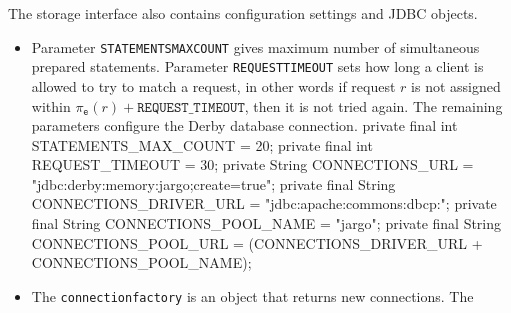 \documentclass{article}
\def\nwendcode{\endtrivlist \endgroup}      %
\theoremstyle{definition}                   %
\begin{document}
The storage interface also contains configuration settings and JDBC objects.
\begin{itemize}
\item Parameter
{\tt{}\protect{}STATEMENTS{}MAX{}COUNT} gives maximum number of simultaneous prepared
statements. Parameter {\tt{}\protect{}REQUEST{}TIMEOUT} sets how long a client is allowed to
try to match a request, in other words if request $r$ is not assigned within
$\pi_\texttt{e}(r)+\texttt{REQUEST\_TIMEOUT}$, then it is not tried again.
The remaining parameters configure the Derby database connection.
\nwenddocs{}\plusendmoddef
private final int    STATEMENTS_MAX_COUNT   = 20;
private final int    REQUEST_TIMEOUT        = 30;
private       String CONNECTIONS_URL        = "jdbc:derby:memory:jargo;create=true";
private final String CONNECTIONS_DRIVER_URL = "jdbc:apache:commons:dbcp:";
private final String CONNECTIONS_POOL_NAME  = "jargo";
private final String CONNECTIONS_POOL_URL   = (CONNECTIONS_DRIVER_URL + CONNECTIONS_POOL_NAME);
\eatline
{}\nwendcode{}\item The {\tt{}\protect{}connection{}factory} is an object that returns new connections. The

\end{itemize}
\end{document}
